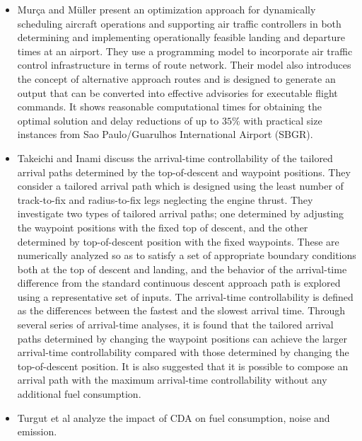 \documentclass{aer1315-pretty}
\begin{document}
\begin{itemize}
\item Mur\c{c}a and M{\"u}ller \cite{Murca:2015} present an optimization approach for dynamically scheduling aircraft operations and supporting air traffic controllers in both determining and implementing operationally feasible landing and departure times at an airport. They use a programming model to incorporate air traffic control infrastructure in terms of route network. Their model also introduces the concept of alternative approach routes and is designed to generate an output that can be converted into effective advisories for executable flight commands. It shows reasonable computational times for obtaining the optimal solution and delay reductions of up to $35 \%$ with practical size instances from Sao Paulo/Guarulhos International Airport (SBGR).

\item Takeichi and Inami \cite{Takeichi:2010} discuss the arrival-time controllability of the tailored arrival paths determined by the top-of-descent and waypoint positions. They consider a tailored arrival path which is designed using the least number of track-to-fix and radius-to-fix legs neglecting the engine thrust. They investigate two types of tailored arrival paths; one determined by adjusting the waypoint positions with the fixed top of descent, and the other determined by top-of-descent position with the fixed waypoints. These are numerically analyzed so as to satisfy a set of appropriate boundary conditions both at the top of descent and landing, and the behavior of the arrival-time difference from the standard continuous descent approach path is explored using a representative set of inputs. The arrival-time controllability is defined as the differences between the fastest and the slowest arrival time. Through several series of arrival-time analyses, it is found that the tailored arrival paths determined by changing the waypoint positions can achieve the larger arrival-time controllability compared with those determined by changing the top-of-descent position. It is also suggested that it is possible to compose an arrival path with the maximum arrival-time controllability without any additional fuel consumption.


\item Turgut et al \cite{Enis:2010} analyze the impact of CDA on fuel consumption, noise and emission.



\end{itemize}
\end{document}
